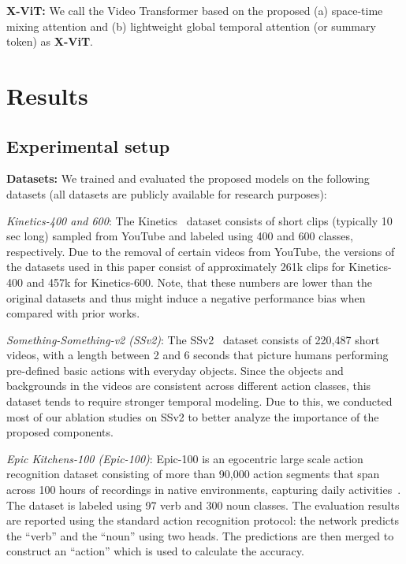 \documentclass{article}
\begin{document}
\noindent\textbf{X-ViT:} We call the Video Transformer based on the proposed (a) space-time mixing attention and (b)  lightweight global temporal attention (or summary token) as \textbf{X-ViT}. 

\section{Results}\label{sec:results}

\subsection{Experimental setup}\label{ssec:results-experimental}

\noindent \textbf{Datasets:} We trained and evaluated the proposed models on the following datasets (all datasets are publicly available for research purposes):

\textit{Kinetics-400 and 600}: The Kinetics~\citep{kay2017kinetics} dataset consists of short clips (typically 10 sec long) sampled from YouTube and labeled using 400 and 600 classes, respectively. Due to the removal of certain videos from YouTube, the versions of the datasets used in this paper consist of approximately 261k clips for Kinetics-400 and 457k for Kinetics-600. Note, that these numbers are lower than the original datasets and thus might induce a negative performance bias when compared with prior works.

\textit{Something-Something-v2 (SSv2)}: The SSv2~\citep{goyal2017something} dataset consists of 220,487 short videos, with a length between 2 and 6 seconds that picture humans performing pre-defined basic actions with everyday objects. Since the objects and backgrounds in the videos are consistent across different action classes, this dataset tends to require stronger temporal modeling.  Due to this, we conducted most of our ablation studies on SSv2 to better analyze the importance of the proposed components.

\textit{Epic Kitchens-100 (Epic-100)}: Epic-100 is an egocentric large scale action recognition dataset consisting of more than 90,000 action segments that span across 100 hours of recordings in native environments, capturing daily activities~\citep{damen2020rescaling}. The dataset is labeled using 97 verb and 300 noun classes. The evaluation results are reported using the standard action recognition protocol: the network predicts the ``verb'' and the ``noun'' using two heads. The predictions are then merged to construct an ``action'' which is used to calculate the accuracy.
\end{document}
